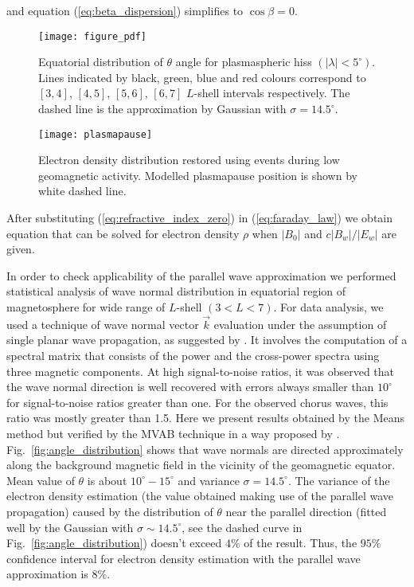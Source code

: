\documentclass[a4paper]{article}
\begin{document}
and equation (\ref{eq:beta_dispersion}) simplifies to $\cos\beta = 0$.

\begin{figure}
\centering
\begin{minipage}{.48\textwidth}
  \centering
  \texttt{[image: figure\_pdf]}
  \caption{Equatorial distribution of $\theta$ angle for plasmaspheric hiss $(| \lambda | < 5^{\circ})$. Lines indicated by black, green, blue and red colours correspond to $[3,4]$, $[4,5]$, $[5,6]$, $[6,7]$ $L$-shell intervals respectively. The dashed line is the approximation by Gaussian with $\sigma = 14.5^{\circ}$.}
  \label{fig:angle_distribution}
\end{minipage}
\hfill
\begin{minipage}{.48\textwidth}
  \centering
  \texttt{[image: plasmapause]}
  \caption{Electron density distribution restored using events during low geomagnetic activity. Modelled plasmapause position is shown by white dashed line.}
  \label{fig3}
\end{minipage}
\end{figure}

After substituting (\ref{eq:refractive_index_zero}) in (\ref{eq:faraday_law}) we obtain equation that can be solved for electron density $\rho$ when $|B_0|$ and $c|B_w| / |E_w|$ are given.

In order to check applicability of the parallel wave approximation we performed statistical analysis of wave normal distribution in equatorial region of magnetosphere for wide range of $L$-shell $(3 < L < 7)$. For data analysis, we used a technique of wave normal vector $\vec{k}$ evaluation under the assumption of single planar wave propagation, as suggested by \citet{means1972use}. It involves the computation of a spectral matrix that consists of the power and the cross-power spectra using three magnetic components. At high signal-to-noise ratios, it was observed that the wave normal direction is well recovered with errors always smaller than $10^{\circ}$ for signal-to-noise ratios greater than one. For the observed chorus waves, this ratio was mostly greater than 1.5. Here we present results obtained by the Means method but verified by the MVAB technique in a way proposed by \citet{agapitov2013statistics}. Fig.~\ref{fig:angle_distribution} shows that wave normals are directed approximately along the background magnetic field in the vicinity of the geomagnetic equator. Mean value of $\theta$ is about $10^{\circ}-15^{\circ}$ and variance $\sigma = 14.5^{\circ}$. The variance of the electron density estimation (the value obtained making use of the parallel wave propagation) caused by the distribution of $\theta$ near the parallel direction (fitted well by the Gaussian with  $\sigma\sim14.5^\circ$, see the dashed curve in Fig.~\ref{fig:angle_distribution}) doesn't exceed $4\%$ of the result. Thus, the $95\%$ confidence interval for electron density estimation with the parallel wave approximation is $8\%$.
\end{document}
